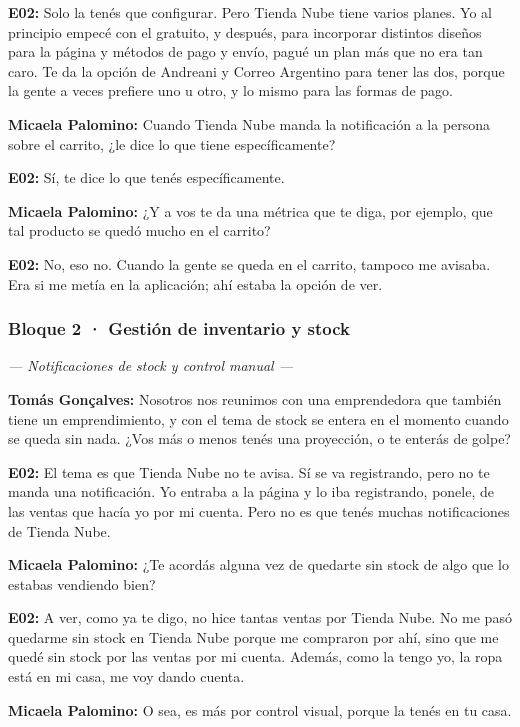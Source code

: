 \noindent\textbf{E02:} Solo la tenés que configurar. Pero Tienda Nube tiene varios planes. Yo al principio empecé con el gratuito, y después, para incorporar distintos diseños para la página y métodos de pago y envío, pagué un plan más que no era tan caro. Te da la opción de Andreani y Correo Argentino para tener las dos, porque la gente a veces prefiere uno u otro, y lo mismo para las formas de pago.

\noindent\textbf{Micaela Palomino:} Cuando Tienda Nube manda la notificación a la persona sobre el carrito, ¿le dice lo que tiene específicamente?

\noindent\textbf{E02:} Sí, te dice lo que tenés específicamente.

\noindent\textbf{Micaela Palomino:} ¿Y a vos te da una métrica que te diga, por ejemplo, que tal producto se quedó mucho en el carrito?

\noindent\textbf{E02:} No, eso no. Cuando la gente se queda en el carrito, tampoco me avisaba. Era si me metía en la aplicación; ahí estaba la opción de ver.

\subsubsection*{Bloque 2 · Gestión de inventario y stock}

\noindent\textit{--- Notificaciones de stock y control manual ---}

\noindent\textbf{Tomás Gonçalves:} Nosotros nos reunimos con una emprendedora que también tiene un emprendimiento, y con el tema de stock se entera en el momento cuando se queda sin nada. ¿Vos más o menos tenés una proyección, o te enterás de golpe?

\noindent\textbf{E02:} El tema es que Tienda Nube no te avisa. Sí se va registrando, pero no te manda una notificación. Yo entraba a la página y lo iba registrando, ponele, de las ventas que hacía yo por mi cuenta. Pero no es que tenés muchas notificaciones de Tienda Nube.

\noindent\textbf{Micaela Palomino:} ¿Te acordás alguna vez de quedarte sin stock de algo que lo estabas vendiendo bien?

\noindent\textbf{E02:} A ver, como ya te digo, no hice tantas ventas por Tienda Nube. No me pasó quedarme sin stock en Tienda Nube porque me compraron por ahí, sino que me quedé sin stock por las ventas por mi cuenta. Además, como la tengo yo, la ropa está en mi casa, me voy dando cuenta.

\noindent\textbf{Micaela Palomino:} O sea, es más por control visual, porque la tenés en tu casa.

